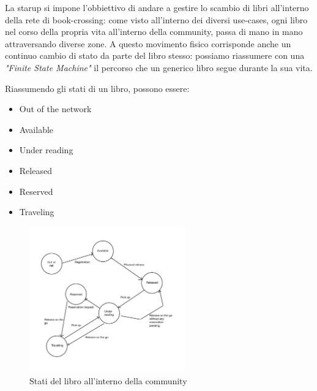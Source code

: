 La starup si impone l'obbiettivo di andare a gestire lo scambio di libri all'interno della rete di book-crossing: come visto all'interno dei diversi use-cases, ogni libro nel corso della propria vita all'interno della community, passa di mano in mano attraversando diverse zone.
A questo movimento fisico corrisponde anche un continuo cambio di stato da parte del libro stesso: possiamo riassumere con una \textit{"Finite State Machine"} il percorso che un generico libro segue durante la sua vita.

Riassumendo gli stati di un libro, possono essere:
\begin{itemize}
	\item Out of the network
	\item Available
	\item Under reading
	\item Released
	\item Reserved
	\item Traveling
\end{itemize}

\begin{figure}[h!]
	\centering
	\includegraphics[width=0.6\textwidth]{Immagini/BookState.jpg}
	\caption{Stati del libro all'interno della community}
	\label{fig:BookState}
\end{figure}